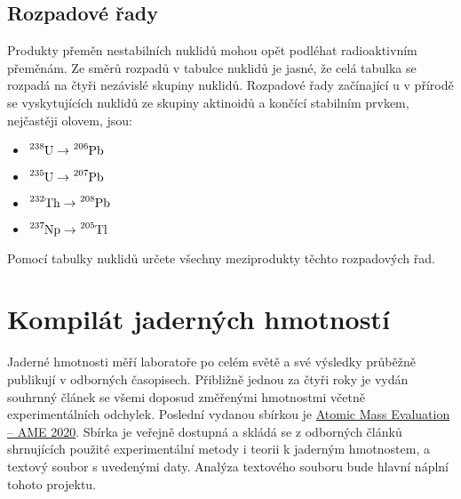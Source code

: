 \documentclass[a4paper,12pt,oneside]{article}
\theoremstyle{red}
\begin{document}
    \subsection{Rozpadové řady}
        Produkty přeměn nestabilních nuklidů mohou opět podléhat radioaktivním přeměnám.
        Ze směrů rozpadů v tabulce nuklidů je jasné, že celá tabulka se rozpadá na čtyři nezávislé skupiny nuklidů.
        Rozpadové řady začínající u v přírodě se vyskytujících nuklidů ze skupiny aktinoidů a končící stabilním prvkem, nejčastěji olovem, jsou:
        \begin{itemize}
            \item $\ce{^{238}U}\rightarrow\ce{^{206}Pb}$
            \item $\ce{^{235}U}\rightarrow\ce{^{207}Pb}$
            \item $\ce{^{232}Th}\rightarrow\ce{^{208}Pb}$
            \item $\ce{^{237}Np}\rightarrow\ce{^{205}Tl}$
        \end{itemize}
        \begin{task}
            Pomocí tabulky nuklidů určete všechny meziprodukty těchto rozpadových řad.
        \end{task}

\section{Kompilát jaderných hmotností}
    Jaderné hmotnosti měří laboratoře po celém světě a své výsledky průběžně publikují v odborných časopisech.
    Přibližně jednou za čtyři roky je vydán souhrnný článek se všemi doposud změřenými hmotnostmi včetně experimentálních odchylek.
    Poslední vydanou sbírkou je \href{https://www-nds.iaea.org/amdc/}{Atomic Mass Evaluation -- AME 2020}.
    Sbírka je veřejně dostupná a skládá se z odborných článků shrnujících použité experimentální metody i teorii k jaderným hmotnostem, a textový soubor s uvedenými daty.
    Analýza textového souboru bude hlavní náplní tohoto projektu.

    
\end{document}
